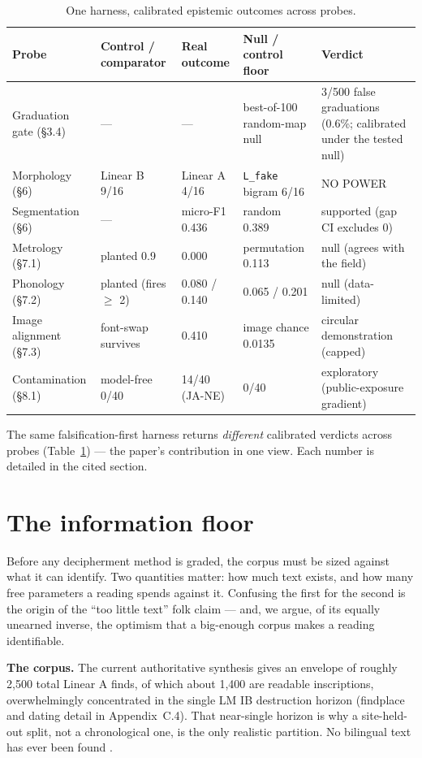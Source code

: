 \begin{table}[t]
\centering
\begin{tabular}{@{}p{2.6cm}p{3.0cm}p{2.4cm}p{3.0cm}p{3.3cm}@{}}
\toprule
\textbf{Probe} & \textbf{Control / comparator} & \textbf{Real outcome} &
\textbf{Null / control floor} & \textbf{Verdict} \\
\midrule
Graduation gate (\S3.4) & --- & --- & best-of-100 random-map null &
3/500 false graduations (0.6\%; calibrated under the tested null) \\
Morphology (\S6) & Linear B 9/16 & Linear A 4/16 & \texttt{L\_fake}
bigram 6/16 & NO POWER \\
Segmentation (\S6) & --- & micro-F1 0.436 & random 0.389 & supported (gap
CI excludes 0) \\
Metrology (\S7.1) & planted 0.9 & 0.000 & permutation 0.113 & null
(agrees with the field) \\
Phonology (\S7.2) & planted (fires $\ge$ 2) & 0.080 / 0.140 & 0.065 /
0.201 & null (data-limited) \\
Image alignment (\S7.3) & font-swap survives & 0.410 & image chance
0.0135 & circular demonstration (capped) \\
Contamination (\S8.1) & model-free 0/40 & 14/40 (JA-NE) & 0/40 &
exploratory (public-exposure gradient) \\
\bottomrule
\end{tabular}
\caption{One harness, calibrated epistemic outcomes across probes.}
\label{tab:harness}
\end{table}

The same falsification-first harness returns \emph{different} calibrated
verdicts across probes (Table~\ref{tab:harness}) --- the paper's
contribution in one view. Each number is detailed in the cited section.

\section{The information floor}

Before any decipherment method is graded, the corpus must be sized against
what it can identify. Two quantities matter: how much text exists, and how
many free parameters a reading spends against it. Confusing the first for
the second is the origin of the ``too little text'' folk claim --- and, we
argue, of its equally unearned inverse, the optimism that a big-enough
corpus makes a reading identifiable.

\textbf{The corpus.} The current authoritative synthesis
\citep{salgarella2025} gives an envelope of roughly 2,500 total Linear A
finds, of which about 1,400 are readable inscriptions, overwhelmingly
concentrated in the single LM IB destruction horizon (findplace and
dating detail in Appendix~C.4). That near-single horizon is why a
site-held-out split, not a chronological one, is the only realistic
partition. No bilingual text has ever been found
\citep[\S8]{salgarella2025}.

